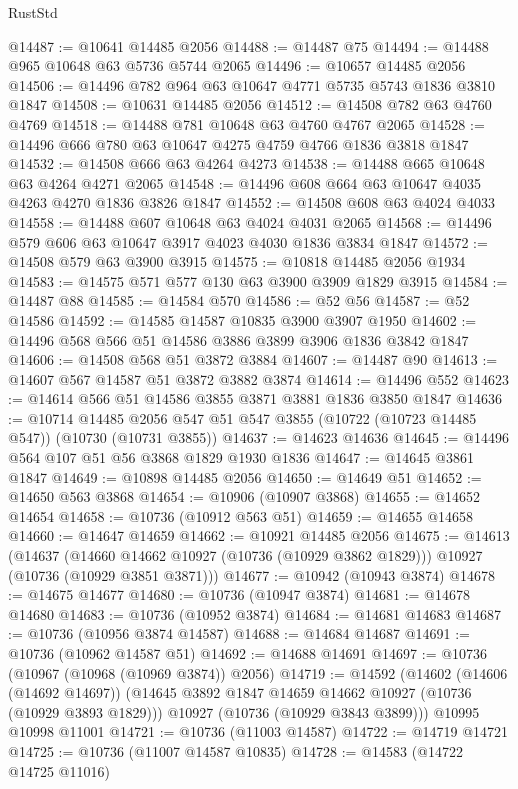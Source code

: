 \begin{lexlean}{RustStd}
\begin{coremodule}
@14487 := @10641 @14485 @2056
@14488 := @14487 @75
@14494 := @14488 @965 @10648 @63 @5736 @5744 @2065
@14496 := @10657 @14485 @2056
@14506 := @14496 @782 @964 @63 @10647 @4771 @5735 @5743 @1836 @3810 @1847
@14508 := @10631 @14485 @2056
@14512 := @14508 @782 @63 @4760 @4769
@14518 := @14488 @781 @10648 @63 @4760 @4767 @2065
@14528 := @14496 @666 @780 @63 @10647 @4275 @4759 @4766 @1836 @3818 @1847
@14532 := @14508 @666 @63 @4264 @4273
@14538 := @14488 @665 @10648 @63 @4264 @4271 @2065
@14548 := @14496 @608 @664 @63 @10647 @4035 @4263 @4270 @1836 @3826 @1847
@14552 := @14508 @608 @63 @4024 @4033
@14558 := @14488 @607 @10648 @63 @4024 @4031 @2065
@14568 := @14496 @579 @606 @63 @10647 @3917 @4023 @4030 @1836 @3834 @1847
@14572 := @14508 @579 @63 @3900 @3915
@14575 := @10818 @14485 @2056 @1934
@14583 := @14575 @571 @577 @130 @63 @3900 @3909 @1829 @3915
@14584 := @14487 @88
@14585 := @14584 @570
@14586 := @52 @56
@14587 := @52 @14586
@14592 := @14585 @14587 @10835 @3900 @3907 @1950
@14602 := @14496 @568 @566 @51 @14586 @3886 @3899 @3906 @1836 @3842 @1847
@14606 := @14508 @568 @51 @3872 @3884
@14607 := @14487 @90
@14613 := @14607 @567 @14587 @51 @3872 @3882 @3874
@14614 := @14496 @552
@14623 := @14614 @566 @51 @14586 @3855 @3871 @3881 @1836 @3850 @1847
@14636 := @10714
    @14485
    @2056
    @547
    @51
    @547
    @3855
    (@10722 (@10723 @14485 @547))
    (@10730 (@10731 @3855))
@14637 := @14623 @14636
@14645 := @14496 @564 @107 @51 @56 @3868 @1829 @1930 @1836
@14647 := @14645 @3861 @1847
@14649 := @10898 @14485 @2056
@14650 := @14649 @51
@14652 := @14650 @563 @3868
@14654 := @10906 (@10907 @3868)
@14655 := @14652 @14654
@14658 := @10736 (@10912 @563 @51)
@14659 := @14655 @14658
@14660 := @14647 @14659
@14662 := @10921 @14485 @2056
@14675 := @14613
    (@14637
      (@14660 @14662 @10927 (@10736 (@10929 @3862 @1829)))
      @10927
      (@10736 (@10929 @3851 @3871)))
@14677 := @10942 (@10943 @3874)
@14678 := @14675 @14677
@14680 := @10736 (@10947 @3874)
@14681 := @14678 @14680
@14683 := @10736 (@10952 @3874)
@14684 := @14681 @14683
@14687 := @10736 (@10956 @3874 @14587)
@14688 := @14684 @14687
@14691 := @10736 (@10962 @14587 @51)
@14692 := @14688 @14691
@14697 := @10736 (@10967 (@10968 (@10969 @3874)) @2056)
@14719 := @14592
    (@14602
      (@14606 (@14692 @14697))
      (@14645 @3892 @1847 @14659 @14662 @10927 (@10736 (@10929 @3893 @1829)))
      @10927
      (@10736 (@10929 @3843 @3899)))
    @10995
    @10998
    @11001
@14721 := @10736 (@11003 @14587)
@14722 := @14719 @14721
@14725 := @10736 (@11007 @14587 @10835)
@14728 := @14583 (@14722 @14725 @11016)

\end{coremodule}
\end{lexlean}

